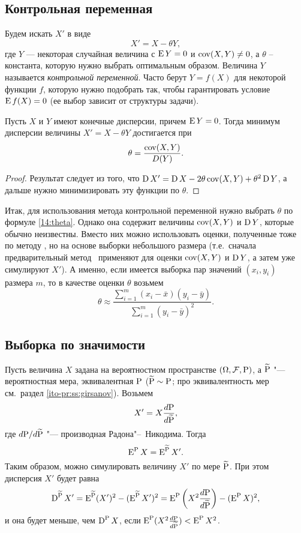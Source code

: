 \subsection{Контрольная переменная}

Будем искать $X'$ в виде
\[
X' = X - \theta Y,
\]
где $Y$ --- некоторая случайная величина с $\E Y = 0$ и $\cov(X,Y)\neq0$, а $\theta$ -- константа, которую нужно выбрать оптимальным образом.
Величина $Y$ называется \emph{контрольной переменной}.
Часто берут $Y= f(X)$ для некоторой функции $f$, которую нужно подобрать так, чтобы гарантировать условие $\E f(X) = 0$ (ее выбор зависит от структуры задачи).

\begin{proposition}
Пусть $X$ и $Y$ имеют конечные дисперсии, причем $\E Y = 0$.
Тогда минимум дисперсии величины $X' = X - \theta Y$ достигается при 
\begin{equation}
\label{14:theta}
\theta = \frac{\cov(X,Y)}{D(Y)}.
\end{equation}
\end{proposition}

\begin{proof}
Результат следует из того, что $\D X' = \D X - 2\theta \cov(X,Y) + \theta^2 \D Y$, а дальше нужно минимизировать эту функции по $\theta$.
\end{proof}

Итак, для использования метода контрольной переменной нужно выбрать $\theta$ по формуле \eqref{14:theta}.
Однако она содержит величины $\cov(X,Y)$ и $\D Y$, которые обычно неизвестны.
Вместо них можно использовать оценки, полученные тоже по методу \mc, но на основе выборки небольшого размера (т.е.\ сначала предварительный метод \mc\ применяют для оценки $\cov(X,Y)$ и $\D Y$, а затем уже  симулируют $X'$).
А именно, если имеется выборка пар значений $(x_i,y_i)$ размера $m$, то в качестве оценки $\theta$ возьмем
\[
\theta \approx \frac{\sum_{i=1}^m (x_i - \bar x)(y_i - \bar y)}{\sum_{i=1}^m (y_i - \bar y)^2}.
\]


\subsection{Выборка по значимости \difficult}
Пусть величина $X$ задана на вероятностном пространстве $(\Omega,\F,\P)$, а $\tilde\P$ "--- вероятностная мера, эквивалентная $\P$ ($\tilde\P\sim\P$; про эквивалентность мер см.~раздел \ref{ito-pr:ss:girsanov}).
Возьмем
\[
X' = X \frac{d\P}{d\tilde\P},
\]
где $d\P/d\tilde\P$ "--- производная Радона"--~Никодима.
Тогда
\[
\E^{\P} X = \E^{\tilde\P} X'.
\]
Таким образом, можно симулировать величину $X'$ по мере $\tilde\P$.
При этом дисперсия $X'$ будет равна
\[
\D^{\tilde \P} X' = \E^{\tilde\P} (X')^2 - (\E^{\tilde\P} X')^2 = \E^{\P} \left(X^2 \frac{d\P}{d\tilde\P}\right) -(\E^{\P} X)^2,
\]
и она будет меньше, чем $\D^\P X$, если $\E^\P(X^2 \frac{d\P}{d\tilde\P}) < \E^\P X^2$. 

